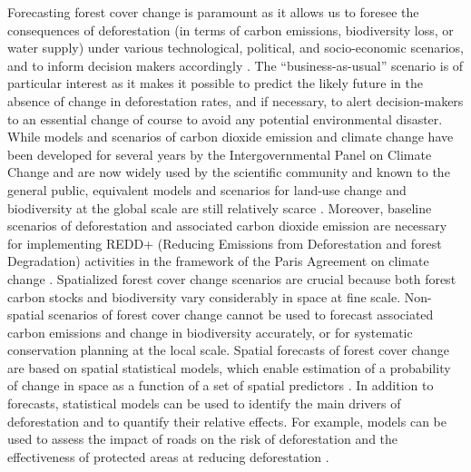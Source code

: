 \documentclass[
  12pt,
]{article}
\begin{document}
Forecasting forest cover change is paramount as it allows us to foresee the consequences of deforestation (in terms of carbon emissions, biodiversity loss, or water supply) under various technological, political, and socio-economic scenarios, and to inform decision makers accordingly \citep{Clark2001}. The ``business-as-usual'' scenario is of particular interest as it makes it possible to predict the likely future in the absence of change in deforestation rates, and if necessary, to alert decision-makers to an essential change of course to avoid any potential environmental disaster. While models and scenarios of carbon dioxide emission and climate change have been developed for several years by the Intergovernmental Panel on Climate Change \citep{IPCC2014} and are now widely used by the scientific community and known to the general public, equivalent models and scenarios for land-use change and biodiversity at the global scale are still relatively scarce \citep{Pereira2020}. Moreover, baseline scenarios of deforestation and associated carbon dioxide emission are necessary for implementing REDD+ (Reducing Emissions from Deforestation and forest Degradation) activities in the framework of the Paris Agreement on climate change \citep{Goetz2015}. Spatialized forest cover change scenarios are crucial because both forest carbon stocks \citep{Baccini2017, Avitabile2016} and biodiversity \citep{Kremen2008, Mittermeier2011} vary considerably in space at fine scale. Non-spatial scenarios of forest cover change \citep{FAO2015} cannot be used to forecast associated carbon emissions and change in biodiversity accurately, or for systematic conservation planning at the local scale. Spatial forecasts of forest cover change are based on spatial statistical models, which enable estimation of a probability of change in space as a function of a set of spatial predictors \citep{Rosa2014}. In addition to forecasts, statistical models can be used to identify the main drivers of deforestation and to quantify their relative effects. For example, models can be used to assess the impact of roads on the risk of deforestation \citep{Laurance2014} and the effectiveness of protected areas at reducing deforestation \citep{Andam2008, Wolf2021}.\\
\end{document}
